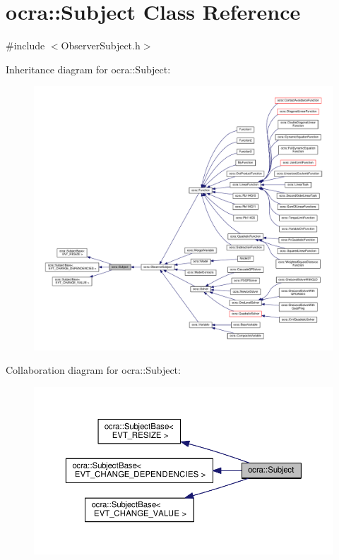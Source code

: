 \hypertarget{classocra_1_1Subject}{}\section{ocra\+:\+:Subject Class Reference}
\label{classocra_1_1Subject}


{\ttfamily \#include $<$Observer\+Subject.\+h$>$}



Inheritance diagram for ocra\+:\+:Subject\+:
\nopagebreak
\begin{figure}[H]
\begin{center}
\leavevmode
\includegraphics[width=350pt]{db/d61/classocra_1_1Subject__inherit__graph}
\end{center}
\end{figure}


Collaboration diagram for ocra\+:\+:Subject\+:
\nopagebreak
\begin{figure}[H]
\begin{center}
\leavevmode
\includegraphics[width=350pt]{d3/d12/classocra_1_1Subject__coll__graph}
\end{center}
\end{figure}
